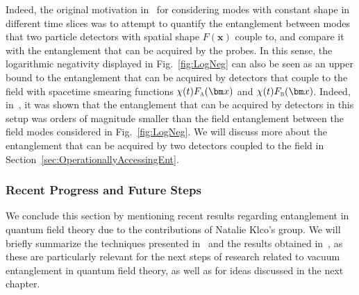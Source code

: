 \documentclass[letterpaper,12pt,titlepage,oneside,final]{book}
\newcommand{\M}{\mathcal{M}}
\newcommand{\mf}{\mathsf}%
\newcommand{\ii}{\mathrm{i}}
\newcommand{\tc}[1]{\textsc{#1}}
\begin{document}

Indeed, the original motivation in~\cite{patriciaAndI} for considering modes with constant shape in different time slices was to attempt to quantify the entanglement between modes that two particle detectors with spatial shape $F(\bm x)$ couple to, and compare it with the entanglement that can be acquired by the probes. In this sense, the logarithmic negativity displayed in Fig.~\ref{fig:LogNeg} can also be seen as an upper bound to the entanglement that can be acquired by detectors that couple to the field with spacetime smearing functions $\chi(t)F_\tc{a}(\bm x)$ and $\chi(t)F_\tc{b}(\bm x)$. Indeed, in~\cite{patriciaAndI}, it was shown that the entanglement that can be acquired by detectors in this setup was orders of magnitude smaller than the field entanglement between the field modes considered in Fig.~\ref{fig:LogNeg}. We will discuss more about the entanglement that can be acquired by two detectors coupled to the field in Section~\ref{sec:OperationallyAccessingEnt}.






\subsubsection*{Recent Progress and Future Steps}

We conclude this section by mentioning recent results regarding entanglement in quantum field theory due to the contributions of Natalie Klco's group. We will briefly summarize the techniques presented in~\cite{KlcoEntStrQFTI} and the results obtained in~\cite{KlcoUVIR,KlcoEntStrQFTII,KlcoEntAllDist}, as these are particularly relevant for the next steps of research related to vacuum entanglement in quantum field theory, as well as for ideas discussed in the next chapter.
\end{document}
